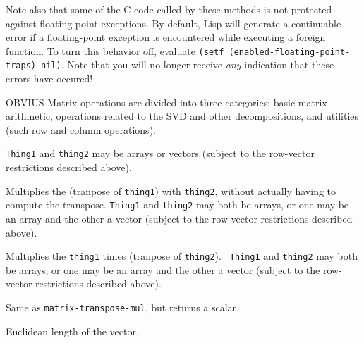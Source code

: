 Note also that some of the C code called by these methods is not
protected against floating-point exceptions.  By default, Lisp will
generate a continuable error if a floating-point exception is
encountered while executing a foreign function.   To turn this
behavior off, evaluate {\tt (setf (enabled-floating-point-traps) nil)}.
Note that you will no longer receive {\em any} indication that these
errors have occured!

OBVIUS Matrix operations are divided into three categories:
basic matrix arithmetic, 
operations related to the SVD and other decompositions,
and utilities (such row and column operations).



\begin{description}

\item{}
{\tt Thing1} and {\tt thing2} may be arrays or vectors (subject to the
row-vector restrictions described above).

\item{}

\item{}
Multiplies the (tranpose of {\tt thing1}) with {\tt thing2}, without
actually having to compute the transpose.  {\tt Thing1} and 
{\tt thing2} may both be arrays, or one may be an array and the other a
vector (subject to the row-vector restrictions described above).

\item{}
Multiplies the {\tt thing1} times (tranpose of {\tt thing2}).  {\tt
Thing1} and {\tt thing2} may both be arrays, or one may be an array
and the other a vector (subject to the row-vector restrictions
described above).

\item{}

\item{}

\item{}
Same as {\tt matrix-transpose-mul}, but returns a scalar.

\item{}
Euclidean length of the vector.


\end{description}
